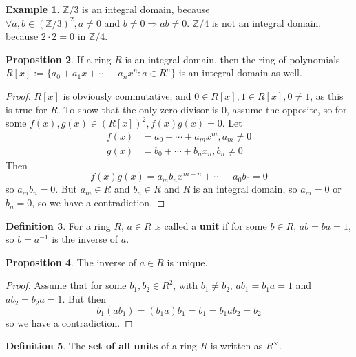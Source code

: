 \documentclass[12pt,a4paper]{article}
\theoremstyle{definition}
\newtheorem{definition}{Definition}[subsection]
\newtheorem{proposition}[definition]{Proposition}
\newtheorem{example}[definition]{Example}
\begin{document}
\begin{example}
	$\mathbb{Z} / 3$ is an integral domain, because $\forall a, b \in {(\mathbb{Z} / 3)}^2, a \ne 0 \text{ and } b \ne 0 \Longrightarrow ab \ne 0$. $\mathbb{Z} / 4$ is not an integral domain, because $\overline{2} \cdot \overline{2} = \overline{0}$ in $\mathbb{Z} / 4$.
\end{example}

\begin{proposition}
	If a ring $R$ is an integral domain, then the ring of polynomials $R[x] := \{ a_0 + a_1 x + \cdots + a_n x^n : \underline{a} \in R^n \}$ is an integral domain as well.
\end{proposition}

\begin{proof}
	$R[x]$ is obviously commutative, and $0 \in R[x], 1 \in R[x], 0 \ne 1$, as this is true for $R$. To show that the only zero divisor is $0$, assume the opposite, so for some $f(x), g(x) \in {(R[x])}^2, f(x) g(x) = 0$. Let
	\[
		\begin{aligned}
			f(x) & = a_0 + \cdots + a_m x^m, a_m \ne 0 \\
			g(x) & = b_0 + \cdots + b_n x_n, b_n \ne 0
		\end{aligned}
	\]
	Then
	\[
		f(x) g(x) = a_m b_n x^{m + n} + \cdots + a_0 b_0 = 0
	\]
	so $a_m b_n = 0$. But $a_m \in R$ and $b_n \in R$ and $R$ is an integral domain, so $a_m = 0$ or $b_n = 0$, so we have a contradiction.
\end{proof}

\begin{definition}
	For a ring $R$, $a \in R$ is called a \textbf{unit} if for some $b \in R$, $ab = ba = 1$, so $b = a^{-1}$ is the inverse of $a$.
\end{definition}

\begin{proposition}
	The inverse of $a \in R$ is unique.
\end{proposition}

\begin{proof}
	Assume that for some $b_1, b_2 \in R^2$, with $b_1 \ne b_2$, $a b_1 = b_1 a = 1$ and $a b_2 = b_2 a = 1$. But then
	\[
		b_1 (a b_1) = (b_1 a) b_1 = b_1 = b_1 a b_2 = b_2
	\]
	so we have a contradiction.
\end{proof}

\begin{definition}
	The \textbf{set of all units} of a ring $R$ is written as $R^{\times}$.
\end{definition}
\end{document}
